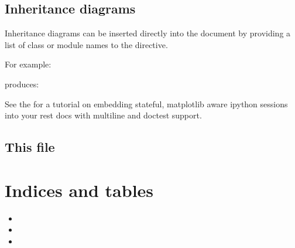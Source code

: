 \documentclass[letterpaper,10pt,english]{sphinxmanual}
\begin{document}
\section{Inheritance diagrams}
\label{\detokenize{chapter2:inheritance-diagrams}}
Inheritance diagrams can be inserted directly into the document by
providing a list of class or module names to the
 directive.

For example:

\begin{sphinxVerbatim}[commandchars=\\\{\}]
  
\end{sphinxVerbatim}

produces:

See the  for a tutorial on embedding stateful,
matplotlib aware ipython sessions into your rest docs with multiline
and doctest support.


\section{This file}
\label{\detokenize{chapter2:this-file}}\label{\detokenize{chapter2:extensions-literal}}

\chapter{Indices and tables}
\label{\detokenize{index:indices-and-tables}}\begin{itemize}
\item {} 

\item {} 

\item {} 

\end{itemize}



\renewcommand{\indexname}{Index}
\printindex
\end{document}
